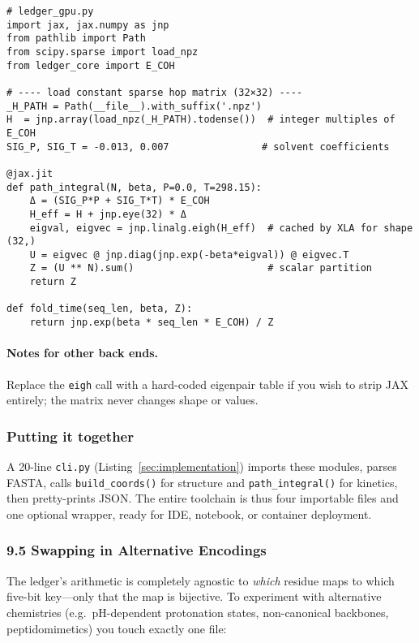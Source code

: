 \documentclass[11pt]{article}
\begin{document}
\begin{verbatim}
# ledger_gpu.py
import jax, jax.numpy as jnp
from pathlib import Path
from scipy.sparse import load_npz
from ledger_core import E_COH

# ---- load constant sparse hop matrix (32×32) ----
_H_PATH = Path(__file__).with_suffix('.npz')
H  = jnp.array(load_npz(_H_PATH).todense())  # integer multiples of E_COH
SIG_P, SIG_T = -0.013, 0.007                # solvent coefficients

@jax.jit
def path_integral(N, beta, P=0.0, T=298.15):
    Δ = (SIG_P*P + SIG_T*T) * E_COH
    H_eff = H + jnp.eye(32) * Δ
    eigval, eigvec = jnp.linalg.eigh(H_eff)  # cached by XLA for shape (32,)
    U = eigvec @ jnp.diag(jnp.exp(-beta*eigval)) @ eigvec.T
    Z = (U ** N).sum()                       # scalar partition
    return Z

def fold_time(seq_len, beta, Z):
    return jnp.exp(beta * seq_len * E_COH) / Z
\end{verbatim}

\paragraph{Notes for other back ends.}
Replace the \texttt{eigh} call with a hard-coded eigenpair table if you
wish to strip JAX entirely; the matrix never changes shape or values.

\subsubsection*{Putting it together}

A 20-line \texttt{cli.py} (Listing~\ref{sec:implementation}) imports these
modules, parses FASTA, calls \texttt{build\_coords()} for structure and
\texttt{path\_integral()} for kinetics, then pretty-prints JSON.  The
entire toolchain is thus four importable files and one optional wrapper,
ready for IDE, notebook, or container deployment.

\subsubsection*{9.5  Swapping in Alternative Encodings}\label{sec:impl-swap}

The ledger’s arithmetic is completely agnostic to \emph{which} residue
maps to which five-bit key—only that the map is bijective.  
To experiment with alternative chemistries (e.g.\ pH-dependent protonation
states, non-canonical backbones, peptidomimetics) you touch exactly one
file:
\end{document}
